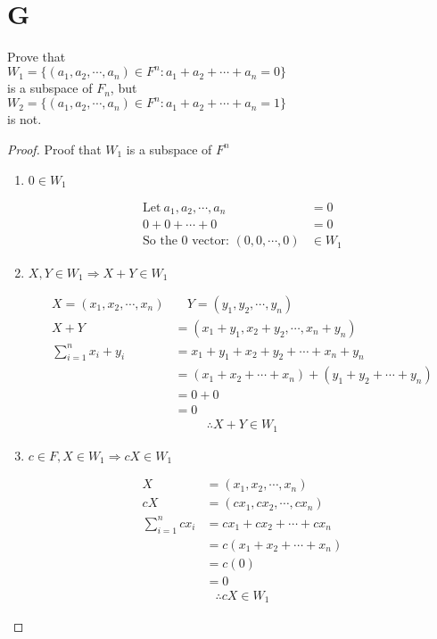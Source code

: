 \documentclass[11pt]{scrartcl}
\makeatletter
\newenvironment{Dequation}
  {%
  \def\tagform@##1{%
    \maketag@@@{\makebox[0pt][r]{(\ignorespaces##1\unskip\@@italiccorr)}}}%
  \ignorespaces
  }
  {%
  \def\tagform@##1{\maketag@@@{(\ignorespaces##1\unskip\@@italiccorr)}}%
  \ignorespacesafterend
  }
\makeatother
\begin{document}
\section{G}
Prove that \\
$W_1 = \{(a_1, a_2,\cdots,a_n) \in F^n : a_1 + a_2 + \cdots + a_n= 0 \}$ \\
is a subspace of $F_n$, but\\
$W_2 =\{(a_1, a_2,\cdots,a_n) \in F^n : a_1 + a_2 + \cdots + a_n= 1\}$ \\
is not.
\begin{proof}
	Proof that $W_1$ is a subspace of $F^n$
	\begin{enumerate}[label=\alph*.]
		\item{
		$0 \in W_1$
		\begin{Dequation}
		\begin{align*}
			\text{Let} \ a_1, a_2, \cdots, a_n & = 0\\
			0 + 0 + \cdots + 0 & = 0 \\
			\text{So the 0 vector: }(0, 0, \cdots, 0) & \in W_1
		\end{align*}
		\end{Dequation}
		}
		\item{
		$X, Y \in W_1 \Rightarrow X + Y \in W_1$
		\begin{Dequation}
		\begin{align*}
			X = (x_1, x_2, \cdots, x_n) & \quad Y = (y_1, y_2, \cdots, y_n) \\
			X + Y & = (x_1 + y_1, x_2 + y_2, \cdots, x_n + y_n)\\
			\sum_{i = 1}^{n} x_i + y_i & = x_1 + y_1 + x_2 + y_2 + \cdots + x_n + y_n\\
			& = (x_1 + x_2 + \cdots + x_n) + (y_1 + y_2 + \cdots + y_n)\\
			& = 0 + 0 \\
			& = 0 
		\end{align*}
		\begin{gather*}
			\therefore X + Y \in W_1
		\end{gather*}
		\end{Dequation}
		}
	\item{
	$c \in F, X \in W_1 \Rightarrow cX \in W_1$
	\begin{Dequation}
	\begin{align*}
		X & = (x_1, x_2, \cdots, x_n) \\
		cX & = (cx_1, cx_2, \cdots, cx_n) \\
		\sum_{i = 1}^{n} cx_i & = cx_1 +  cx_2 + \cdots + cx_n \\
		& = c(x_1 + x_2 + \cdots + x_n) \\
		& = c(0) \\
		& = 0 
	\end{align*}
	\begin{gather*}
		\therefore cX \in W_1
	\end{gather*}
	\end{Dequation}
	}
	\end{enumerate}
\end{proof}
\end{document}
